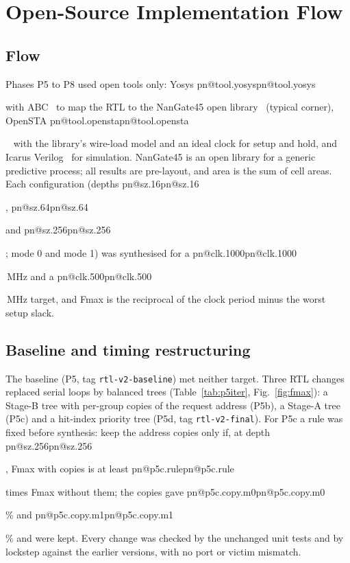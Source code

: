 \documentclass[11pt,a4paper]{report}
\makeatletter
\DeclareRobustCommand{\R}[1]{\ifcsname pn@#1\endcsname\csname pn@#1\endcsname\else
  \PackageError{report}{number key '#1' is not defined in macros.tex}{Run tools/make_paper_macros.py --target report}\fi}
\makeatother
\begin{document}
\chapter{Open-Source Implementation Flow}\label{ch:open}
\section{Flow}
Phases P5 to P8 used open tools only: Yosys \R{tool.yosys} with ABC~\cite{wolf_yosys,brayton2010abc} to map the RTL to
the NanGate45 open library~\cite{nangate45} (typical corner), OpenSTA \R{tool.opensta}~\cite{opensta} with the
library's wire-load model and an ideal clock for setup and hold, and Icarus Verilog~\cite{icarus} for simulation.
NanGate45 is an open library for a generic predictive process; all results are pre-layout, and area is the sum of
cell areas. Each configuration (depths \R{sz.16}, \R{sz.64} and \R{sz.256}; mode 0 and mode 1) was synthesised for a \R{clk.1000}\,MHz
and a \R{clk.500}\,MHz target, and Fmax is the reciprocal of the clock period minus the worst setup slack.

\section{Baseline and timing restructuring}
The baseline (P5, tag \texttt{rtl-v2-baseline}) met neither target. Three RTL changes replaced serial loops by balanced trees (Table~\ref{tab:p5iter},
Fig.~\ref{fig:fmax}): a Stage-B tree with per-group copies of the request address (P5b), a Stage-A tree (P5c) and a
hit-index priority tree (P5d, tag \texttt{rtl-v2-final}). For P5c a rule was fixed before synthesis: keep the address
copies only if, at depth \R{sz.256}, Fmax with copies is at least \R{p5c.rule} times Fmax without them; the copies gave
\R{p5c.copy.m0}\% and \R{p5c.copy.m1}\% and were kept. Every change was checked by the unchanged unit tests and by
lockstep against the earlier versions, with no port or victim mismatch.
\end{document}
